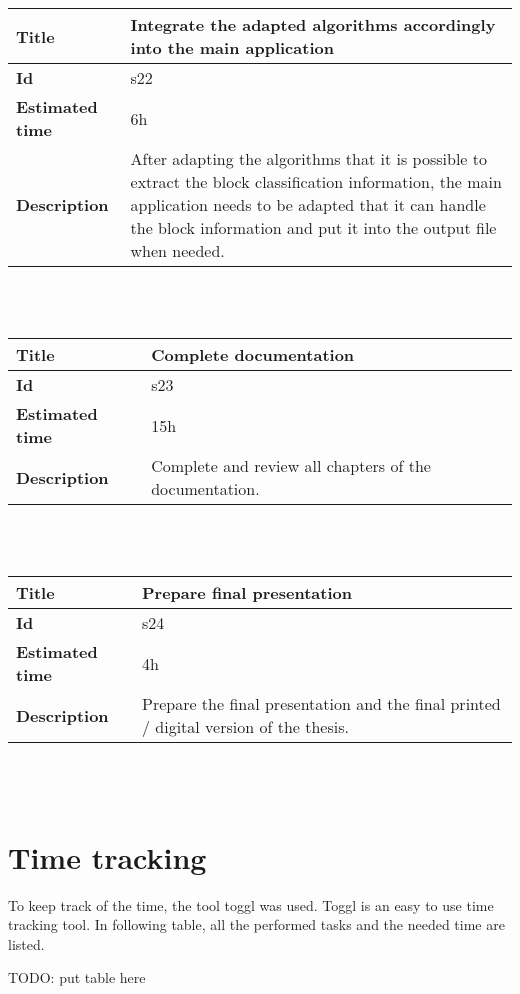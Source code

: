      \begin{tabular}{ | p{4cm} | p{10cm} |}
    \hline
    \textbf{Title} & Integrate the adapted algorithms accordingly into the main application\\ \hline
    \textbf{Id} & s22\\ \hline
    \textbf{Estimated time} & 6h \\ \hline
    \textbf{Description} &  After adapting the algorithms that it is possible to extract the block classification information, the main application needs to be adapted that it can handle the block information and put it into the output file when needed.\\ 
    \hline
    \end{tabular} \\\\


    \begin{tabular}{ | p{4cm} | p{10cm} |}
    \hline
    \textbf{Title} & Complete documentation\\ \hline
    \textbf{Id} & s23\\ \hline
    \textbf{Estimated time} & 15h \\ \hline
    \textbf{Description} &  Complete and review all chapters of the documentation.  \\ 
    \hline
    \end{tabular} \\\\

    \begin{tabular}{ | p{4cm} | p{10cm} |}
    \hline
    \textbf{Title} & Prepare final presentation\\ \hline
    \textbf{Id} & s24\\ \hline
    \textbf{Estimated time} & 4h \\ \hline
    \textbf{Description} &  Prepare the final presentation and the final printed / digital version of the thesis.  \\ 
    \hline
    \end{tabular} \\\\





\section{Time tracking}
    \label{sec:Time tracking}

To keep track of the time, the tool toggl was used. Toggl is an easy to use time tracking tool. In following table, all the performed tasks and the needed time are listed.



TODO: put table here


